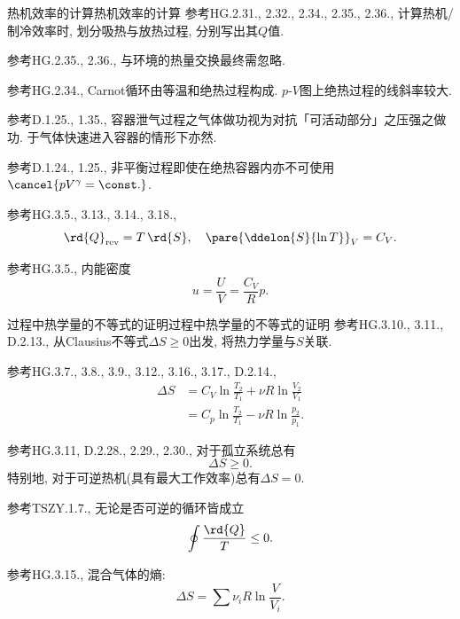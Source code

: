 \documentclass{ctexart}
\begin{document}
\begin{reflex}
	{热机效率的计算}{热机效率的计算} 参考HG.2.31., 2.32., 2.34., 2.35., 2.36., 计算热机/制冷效率时, 划分吸热与放热过程, 分别写出其$Q$值.
\end{reflex}
\begin{pitfall}
	参考HG.2.35., 2.36., 与环境的热量交换最终需忽略.
\end{pitfall}
\begin{finale}
	参考HG.2.34., Carnot循环由等温和绝热过程构成. $p$-$V$图上绝热过程的线斜率较大.
\end{finale}
\begin{finale}
	参考D.1.25., 1.35., 容器泄气过程之气体做功视为对抗「可活动部分」之压强之做功. 于气体快速进入容器的情形下亦然.
\end{finale}
\begin{pitfall}
	参考D.1.24., 1.25., 非平衡过程即使在绝热容器内亦不可使用$\cancel{pV^\gamma=\const.}$.
\end{pitfall}
\begin{finale}
	参考HG.3.5., 3.13., 3.14., 3.18.,
	\[ \rd{Q}_{\mathrm{rev}} = T\,\rd{S},\quad \pare{\ddelon{S}{\ln T}}_V = C_V. \]
\end{finale}
\begin{finale}
	参考HG.3.5., 内能密度
	\[ u = \frac{U}{V} = \frac{C_V}{R}p. \]
\end{finale}

\begin{reflex}
	{过程中热学量的不等式的证明}{过程中热学量的不等式的证明} 参考HG.3.10., 3.11., D.2.13., 从Clausius不等式$\Delta S\ge 0$出发, 将热力学量与$S$关联.
\end{reflex}

\begin{finale}
	参考HG.3.7., 3.8., 3.9., 3.12., 3.16., 3.17., D.2.14.,
	\begin{align*}
		\Delta S &= C_V \ln\frac{T_2}{T_1} + \nu R\ln\frac{V_2}{V_1} \\
		&= C_p \ln\frac{T_2}{T_1} - \nu R\ln\frac{p_2}{p_1}.
	\end{align*}
\end{finale}

\begin{finale}
	参考HG.3.11, D.2.28., 2.29., 2.30., 对于孤立系统总有
	\[ \Delta S \ge 0. \]
	特别地, 对于可逆热机(具有最大工作效率)总有$\Delta S = 0$.
\end{finale}
\begin{finale}
	参考TSZY.1.7., 无论是否可逆的循环皆成立
	\[ \oint \frac{\rd{Q}}{T} \le 0. \]
\end{finale}
\begin{finale}
	参考HG.3.15., 混合气体的熵:
	\[ \Delta S = \sum \nu_i R\ln \frac{V}{V_i}. \]
\end{finale}
\end{document}
